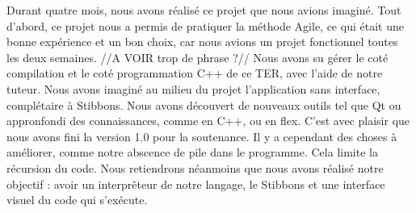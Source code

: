 Durant quatre mois, nous avons réalisé ce projet que nous avions imaginé.
Tout d'abord, ce projet nous a permis de pratiquer la méthode Agile, ce qui était une bonne expérience et un bon choix, car nous avions un projet fonctionnel toutes les deux semaines.
//A VOIR trop de phrase ?//
Nous avons su gérer le coté compilation et le coté programmation C++ de ce TER, avec l'aide de notre tuteur.
Nous avons imaginé au milieu du projet l'application sans interface, complétaire à Stibbons.
Nous avons découvert de nouveaux outils tel que Qt ou appronfondi des connaissances, comme en C++, ou en flex.
 C'est avec plaisir que nous avons fini la version 1.0 pour la soutenance.
Il y a cependant des choses à améliorer, comme notre abscence de pile dans le programme. Cela limite la récursion du code.
Nous retiendrons néanmoins que nous avons réalisé notre objectif : avoir un interprêteur de notre langage, le Stibbons et une interface visuel du code qui s'exécute.
